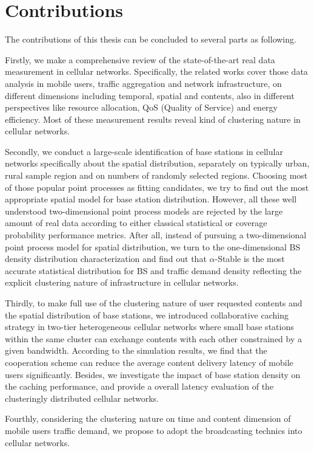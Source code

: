 \section{Contributions}

The contributions of this thesis can be concluded to several parts as following.

Firstly, we make a comprehensive review of the state-of-the-art real data measurement in cellular networks. Specifically, the related works cover those data analysis in mobile users, traffic aggregation and network infrastructure, on different dimensions including temporal, spatial and contents, also in different perspectives like resource allocation, QoS (Quality of Service) and energy efficiency. Most of these measurement results reveal kind of clustering nature in cellular networks.

Secondly, we conduct a large-scale identification of base stations in cellular networks specifically about the spatial distribution, separately on typically urban, rural sample region and on numbers of randomly selected regions. Choosing most of those popular point processes as fitting candidates, we try to find out the most appropriate spatial model for base station distribution. However, all these well understood two-dimensional point process models are rejected by the large amount of real data according to either classical statistical or coverage probability performance metrics. After all, instead of pursuing a two-dimensional point process model for spatial distribution, we turn to the one-dimensional BS density distribution characterization and find out that $\alpha$-Stable is the most accurate statistical distribution for BS and traffic demand density reflecting the explicit clustering nature of infrastructure in cellular networks.

Thirdly, to make full use of the clustering nature of user requested contents and the spatial distribution of base stations, we introduced collaborative caching strategy in two-tier heterogeneous cellular networks where small base stations within the same cluster can exchange contents with each other constrained by a given bandwidth. According to the simulation results, we find that the cooperation scheme can reduce the average content delivery latency of mobile users significantly. Besides, we investigate the impact of base station density on the caching performance, and provide a overall latency evaluation of the clusteringly distributed cellular networks.

Fourthly, considering the clustering nature on time and content dimension of mobile users traffic demand, we propose to adopt the broadcasting technics into cellular networks.


